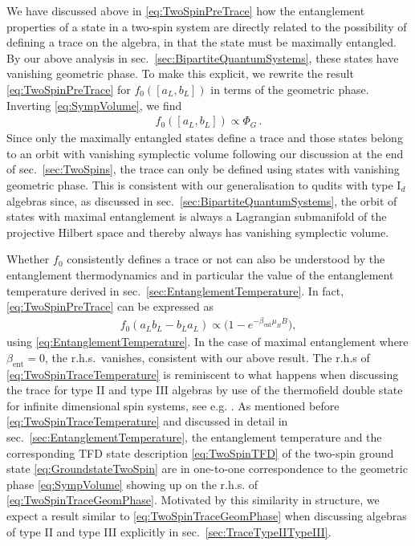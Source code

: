 \documentclass[a4paper,11pt]{article}
\newcommand{\1}{\mathds{1}}
\begin{document}
We have discussed above in \eqref{eq:TwoSpinPreTrace} how the entanglement properties of a state in a two-spin system are directly related to the possibility of defining a trace on the algebra, in that the state must be maximally entangled. By our above analysis in sec.~\ref{sec:BipartiteQuantumSystems}, these states have vanishing geometric phase. To make this explicit, we rewrite the result \eqref{eq:TwoSpinPreTrace} for $f_0([a_L,b_L])$ in terms of the geometric phase. Inverting \eqref{eq:SympVolume}, we find
\begin{align}
    f_0([a_L,b_L])\propto\Phi_G\,.\label{eq:TwoSpinTraceGeomPhase}
\end{align}
Since only the maximally entangled states define a trace and those states belong to an orbit with vanishing symplectic volume following our discussion at the end of sec.~\ref{sec:TwoSpins}, the trace can only be defined using states with vanishing geometric phase. This is consistent with our generalisation to qudits with type I$_d$ algebras since, as discussed in sec.~\ref{sec:BipartiteQuantumSystems}, the orbit of states with maximal entanglement is always a Lagrangian submanifold of the projective Hilbert space and thereby always has vanishing symplectic volume.

Whether $f_0$ consistently defines a trace or not can also be understood by the entanglement thermodynamics and in particular the value of the entanglement temperature derived in sec.~\ref{sec:EntanglementTemperature}. In fact, \eqref{eq:TwoSpinPreTrace} can be expressed as
\begin{align}
    f_0(a_Lb_L-b_La_L)\propto\big(1-e^{-\beta_{\text{ent}}\mu_BB}\big),\label{eq:TwoSpinTraceTemperature}
\end{align}
using \eqref{eq:EntanglementTemperature}. In the case of maximal entanglement where $\beta_{\text{ent}}=0$, the r.h.s.~vanishes, consistent with our above result. The r.h.s of \eqref{eq:TwoSpinTraceTemperature} is reminiscent to what happens when discussing the trace for type II and type III algebras by use of the thermofield double state for infinite dimensional spin systems, see e.g. \cite{Witten:2021jzq}. As mentioned before \eqref{eq:TwoSpinTraceTemperature} and discussed in detail in sec.~\ref{sec:EntanglementTemperature}, the entanglement temperature and the corresponding TFD state description \eqref{eq:TwoSpinTFD} of the two-spin ground state \eqref{eq:GroundstateTwoSpin} are in one-to-one correspondence to the geometric phase \eqref{eq:SympVolume} showing up on the r.h.s. of \eqref{eq:TwoSpinTraceGeomPhase}. Motivated by this similarity in structure, we expect a result similar to \eqref{eq:TwoSpinTraceGeomPhase} when discussing algebras of type II and type III explicitly in sec.~\ref{sec:TraceTypeIITypeIII}.
\end{document}
